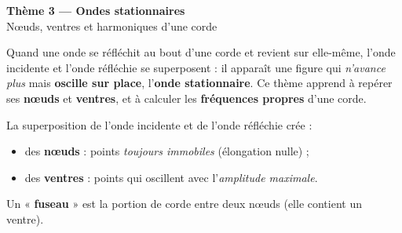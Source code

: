 \documentclass[11pt,a4paper]{article}
\begin{document}

\begin{center}
{\LARGE\bfseries\color{primarydark} Thème 3 — Ondes stationnaires}\\[2pt]
{\large\color{primary} Nœuds, ventres et harmoniques d'une corde}
\end{center}

\medskip
Quand une onde se réfléchit au bout d'une corde et revient sur elle-même, l'onde incidente et
l'onde réfléchie se superposent : il apparaît une figure qui \emph{n'avance plus} mais
\textbf{oscille sur place}, l'\textbf{onde stationnaire}. Ce thème apprend à repérer ses
\textbf{nœuds} et \textbf{ventres}, et à calculer les \textbf{fréquences propres} d'une corde.

\begin{cle}
La superposition de l'onde incidente et de l'onde réfléchie crée :
\begin{itemize}[leftmargin=1.4em,topsep=2pt,itemsep=1.5pt]
  \item des \textbf{nœuds} : points \emph{toujours immobiles} (élongation nulle) ;
  \item des \textbf{ventres} : points qui oscillent avec l'\emph{amplitude maximale}.
\end{itemize}
Un « \textbf{fuseau} » est la portion de corde entre deux nœuds (elle contient un ventre).
\end{cle}

\begin{center}
\end{center}
\end{document}
